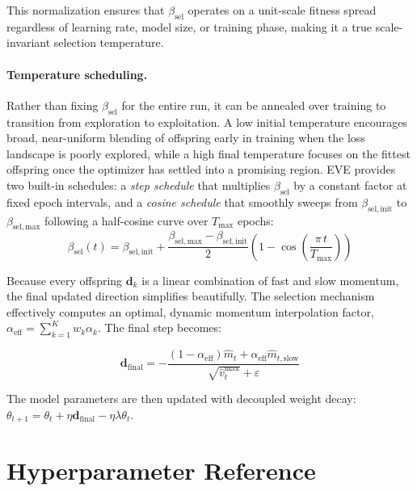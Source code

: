 \documentclass[12pt]{article}
\begin{document}
This normalization ensures that $\beta_{\mathrm{sel}}$ operates on a unit-scale fitness spread regardless of learning rate, model size, or training phase, making it a true scale-invariant selection temperature.

\paragraph{Temperature scheduling.}
Rather than fixing $\beta_{\mathrm{sel}}$ for the entire run, it can be annealed over training to transition from exploration to exploitation. A low initial temperature encourages broad, near-uniform blending of offspring early in training when the loss landscape is poorly explored, while a high final temperature focuses on the fittest offspring once the optimizer has settled into a promising region. EVE provides two built-in schedules: a \emph{step schedule} that multiplies $\beta_{\mathrm{sel}}$ by a constant factor at fixed epoch intervals, and a \emph{cosine schedule} that smoothly sweeps from $\beta_{\mathrm{sel,init}}$ to $\beta_{\mathrm{sel,max}}$ following a half-cosine curve over $T_{\max}$ epochs:
\begin{equation}
  \beta_{\mathrm{sel}}(t) = \beta_{\mathrm{sel,init}} + \frac{\beta_{\mathrm{sel,max}} - \beta_{\mathrm{sel,init}}}{2}\left(1 - \cos\!\left(\frac{\pi\, t}{T_{\max}}\right)\right)
  \label{eq:temp-schedule}
\end{equation}

Because every offspring $\mathbf{d}_k$ is a linear combination of fast and slow momentum, the final updated direction simplifies beautifully. The selection mechanism effectively computes an optimal, dynamic momentum interpolation factor, $\alpha_{\mathrm{eff}} = \sum_{k=1}^K w_k \alpha_k$. The final step becomes:

\begin{equation}
  \mathbf{d}_{\mathrm{final}} = - \frac{(1 - \alpha_{\mathrm{eff}})\hat{m}_t + \alpha_{\mathrm{eff}}\hat{m}_{t,\mathrm{slow}}}{\sqrt{\hat{v}^{\max}_t} + \varepsilon}
\end{equation}

The model parameters are then updated with decoupled weight decay: $\theta_{t+1} = \theta_t + \eta \mathbf{d}_{\mathrm{final}} - \eta \lambda \theta_t$.

\section{Hyperparameter Reference}
\label{sec:hyperparams}
\end{document}
